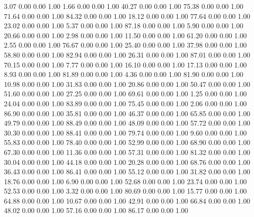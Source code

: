     3.07   0.00   0.00   1.00
    1.66   0.00   0.00   1.00
   40.27   0.00   0.00   1.00
   75.38   0.00   0.00   1.00
   71.64   0.00   0.00   1.00
   84.32   0.00   0.00   1.00
   18.12   0.00   0.00   1.00
   77.64   0.00   0.00   1.00
   23.02   0.00   0.00   1.00
    5.37   0.00   0.00   1.00
   87.18   0.00   0.00   1.00
    5.90   0.00   0.00   1.00
   20.66   0.00   0.00   1.00
    2.98   0.00   0.00   1.00
   11.50   0.00   0.00   1.00
   61.20   0.00   0.00   1.00
    2.55   0.00   0.00   1.00
   76.67   0.00   0.00   1.00
   25.40   0.00   0.00   1.00
   37.98   0.00   0.00   1.00
   58.80   0.00   0.00   1.00
   82.94   0.00   0.00   1.00
   26.31   0.00   0.00   1.00
   87.01   0.00   0.00   1.00
   70.15   0.00   0.00   1.00
    7.77   0.00   0.00   1.00
   16.10   0.00   0.00   1.00
   17.13   0.00   0.00   1.00
    8.93   0.00   0.00   1.00
   81.89   0.00   0.00   1.00
    4.36   0.00   0.00   1.00
   81.90   0.00   0.00   1.00
   10.98   0.00   0.00   1.00
   31.83   0.00   0.00   1.00
   20.86   0.00   0.00   1.00
   50.47   0.00   0.00   1.00
   51.60   0.00   0.00   1.00
   27.25   0.00   0.00   1.00
   69.61   0.00   0.00   1.00
    1.25   0.00   0.00   1.00
   24.04   0.00   0.00   1.00
   83.89   0.00   0.00   1.00
   75.45   0.00   0.00   1.00
    2.06   0.00   0.00   1.00
   86.90   0.00   0.00   1.00
   35.81   0.00   0.00   1.00
   46.37   0.00   0.00   1.00
   65.85   0.00   0.00   1.00
   49.79   0.00   0.00   1.00
   88.49   0.00   0.00   1.00
   48.09   0.00   0.00   1.00
   57.72   0.00   0.00   1.00
   30.30   0.00   0.00   1.00
   88.41   0.00   0.00   1.00
   79.74   0.00   0.00   1.00
    9.60   0.00   0.00   1.00
   55.83   0.00   0.00   1.00
   78.40   0.00   0.00   1.00
   52.99   0.00   0.00   1.00
   68.90   0.00   0.00   1.00
   67.30   0.00   0.00   1.00
   11.36   0.00   0.00   1.00
   57.31   0.00   0.00   1.00
   81.32   0.00   0.00   1.00
   30.04   0.00   0.00   1.00
   44.18   0.00   0.00   1.00
   20.28   0.00   0.00   1.00
   68.76   0.00   0.00   1.00
   36.43   0.00   0.00   1.00
   86.41   0.00   0.00   1.00
   55.12   0.00   0.00   1.00
   31.82   0.00   0.00   1.00
   18.76   0.00   0.00   1.00
    6.90   0.00   0.00   1.00
   52.68   0.00   0.00   1.00
   23.74   0.00   0.00   1.00
   52.53   0.00   0.00   1.00
    3.32   0.00   0.00   1.00
   80.69   0.00   0.00   1.00
   15.77   0.00   0.00   1.00
   64.88   0.00   0.00   1.00
   10.67   0.00   0.00   1.00
   42.91   0.00   0.00   1.00
   66.84   0.00   0.00   1.00
   48.02   0.00   0.00   1.00
   57.16   0.00   0.00   1.00
   86.17   0.00   0.00   1.00
